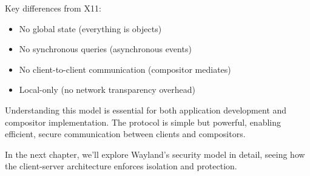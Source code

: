 Key differences from X11:
\begin{itemize}
    \item No global state (everything is objects)
    \item No synchronous queries (asynchronous events)
    \item No client-to-client communication (compositor mediates)
    \item Local-only (no network transparency overhead)
\end{itemize}

Understanding this model is essential for both application development and compositor implementation. The protocol is simple but powerful, enabling efficient, secure communication between clients and compositors.

In the next chapter, we'll explore Wayland's security model in detail, seeing how the client-server architecture enforces isolation and protection.

\clearpage
